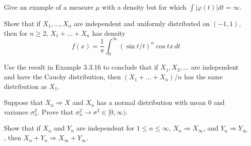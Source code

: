   \begin{exercise}[Durrett 3.3.4]
    Give an example of a measure $\mu$ with a density but for which $\int |\varphi(t)| dt = \infty$.
  \end{exercise}
  \begin{solution}

  \end{solution}

  \begin{exercise}[Durrett 3.3.5]
    Show that if $X_1, \dots, X_n$ are independent and uniformly distributed on $(-1, 1)$, then for $n \geq 2$, $X_1 + \dots + X_n$ has density
    \begin{equation*}
      f(x) = \frac{1}{\pi} \int_0^\infty (\sin t / t)^n \cos tx \, dt
    \end{equation*}
  \end{exercise}
  \begin{solution}

  \end{solution}

  \begin{exercise}[Durrett 3.3.6]
    Use the result in Example 3.3.16 to conclude that if $X_1, X_2, \dots$ are independent and have the Cauchy distribution, then $(X_1 + \dots + X_n)/n$ has the same distribution as $X_1$.
  \end{exercise}
  \begin{solution}

  \end{solution}

  \begin{exercise}[Durrett 3.3.7]
    Suppose that $X_n \Rightarrow X$ and $X_n$ has a normal distribution with mean 0 and variance $\sigma_n^2$. Prove that $\sigma_n^2 \to \sigma^2 \in [0, \infty)$.
  \end{exercise}
  \begin{solution}

  \end{solution}

  \begin{exercise}[Durrett 3.3.8]
    Show that if $X_n$ and $Y_n$ are independent for $1 \leq n \leq \infty$, $X_n \Rightarrow X_\infty$, and $Y_n \Rightarrow Y_\infty$, then $X_n + Y_n \Rightarrow X_\infty + Y_\infty$.
  \end{exercise}
  \begin{solution}

  \end{solution}

